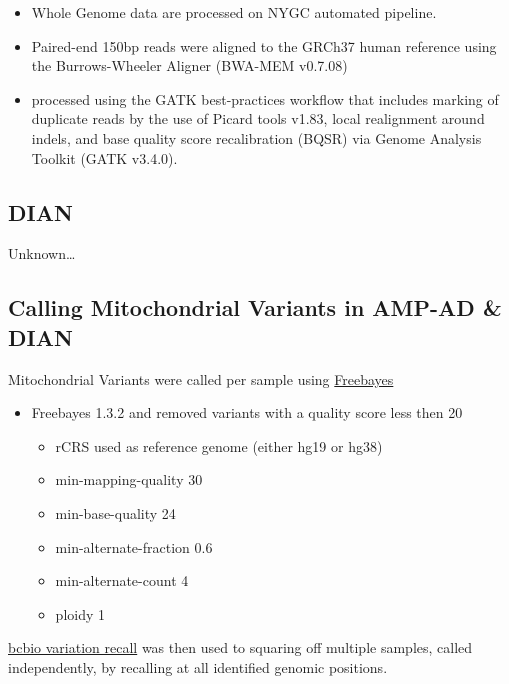 \documentclass[]{book}
\providecommand{\tightlist}{%
  \setlength{\itemsep}{0pt}\setlength{\parskip}{0pt}}
\begin{document}
\begin{itemize}
\tightlist
\item
  Whole Genome data are processed on NYGC automated pipeline.
\item
  Paired-end 150bp reads were aligned to the GRCh37 human reference using the Burrows-Wheeler Aligner (BWA-MEM v0.7.08)
\item
  processed using the GATK best-practices workflow that includes marking of duplicate reads by the use of Picard tools v1.83, local realignment around indels, and base quality score recalibration (BQSR) via Genome Analysis Toolkit (GATK v3.4.0).
\end{itemize}

\hypertarget{dian}{%
\subsection{DIAN}\label{dian}}

Unknown\ldots{}

\hypertarget{calling-mitochondrial-variants-in-amp-ad-dian}{%
\subsection{Calling Mitochondrial Variants in AMP-AD \& DIAN}\label{calling-mitochondrial-variants-in-amp-ad-dian}}

Mitochondrial Variants were called per sample using \href{https://arxiv.org/abs/1207.3907}{Freebayes}

\begin{itemize}
\tightlist
\item
  Freebayes 1.3.2 and removed variants with a quality score less then 20

  \begin{itemize}
  \tightlist
  \item
    rCRS used as reference genome (either hg19 or hg38)
  \item
    min-mapping-quality 30\\
  \item
    min-base-quality 24
  \item
    min-alternate-fraction 0.6
  \item
    min-alternate-count 4\\
  \item
    ploidy 1
  \end{itemize}
\end{itemize}

\href{https://github.com/bcbio/bcbio.variation.recall}{bcbio variation recall} was then used to squaring off multiple samples, called independently, by recalling at all identified genomic positions.
\end{document}
